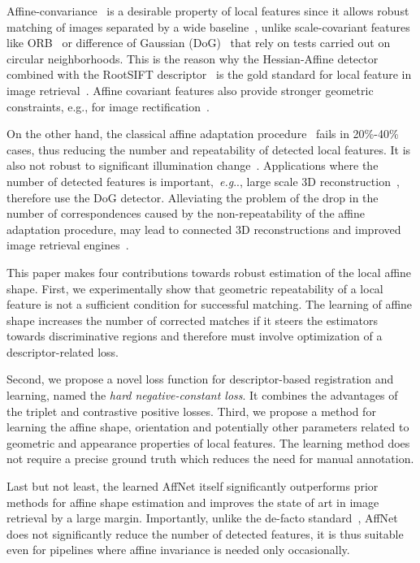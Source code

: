 \documentclass[runningheads]{llncs}
\makeatletter
\DeclareRobustCommand\onedot{\futurelet\@let@token\@onedot}
\def\@onedot{\ifx\@let@token.\else.\null\fi\xspace}
\def\eg{\emph{e.g}\onedot} \def\Eg{\emph{E.g}\onedot}
\makeatother
\begin{document}
Affine-convariance~\cite{Mikolajczyk2004} is a desirable property of local features
since it allows robust matching of images separated by a wide baseline~\cite{Mikolajczyk2005,MODS2015}, unlike scale-covariant features like ORB~\cite{Rublee2011} or difference of Gaussian (DoG)~\cite{SIFT2004} that rely on tests carried out on circular neighborhoods. This is the reason why the Hessian-Affine detector~\cite{Mikolajczyk2004} combined with the RootSIFT descriptor~\cite{SIFT2004,RootSIFT2012} is the gold standard for local feature in image retrieval~\cite{Perdoch-CVPR2009efficient,Tolias-PR2014HQE}. Affine covariant features also provide stronger geometric constraints, e.g., for image rectification~\cite{RepPat2018}.

On the other hand, the classical affine adaptation procedure~\cite{Baumberg2000} fails in 20\%-40\%~\cite{Mikolajczyk2005,WXBS2015} cases, thus reducing the number and repeatability of detected local features.
It is also not robust to significant illumination change~\cite{WXBS2015}. Applications where the number of detected features is important,~\eg, large scale 3D reconstruction~\cite{schoenberger2017}, therefore use the DoG detector. 
Alleviating the problem of the drop in the number of correspondences caused by the non-repeatability of the affine adaptation procedure,
may lead to connected 3D reconstructions and improved image retrieval engines~\cite{Schonberger-CVPR2015retrievalsfm,radenovic2016dusk}.

This paper makes four contributions towards robust estimation of the local affine shape. 
First, we experimentally show that geometric repeatability of a local feature is not a sufficient condition for successful matching. The learning of affine shape increases the number of corrected matches if it steers the estimators towards discriminative regions and therefore must involve optimization of a descriptor-related loss.

Second, we propose a novel loss function for descriptor-based registration and learning, named the {\it hard negative-constant loss}. It combines the advantages of the triplet and contrastive positive losses. Third, we propose a method for learning the affine shape, orientation and potentially other parameters related to  geometric and appearance properties of local features. The learning method  does not require a precise ground truth which reduces the need for manual annotation. 

Last but not least, the learned AffNet itself significantly outperforms prior methods for affine shape estimation and improves the state of art in image retrieval by a large margin. Importantly, unlike the
de-facto standard~\cite{Baumberg2000}, AffNet does not significantly reduce the number of detected features, it is thus suitable even for pipelines where affine invariance is needed only occasionally.
\end{document}
